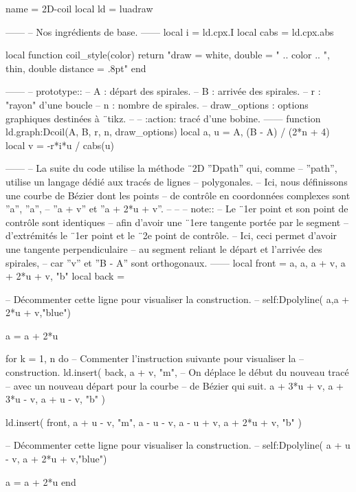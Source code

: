 \documentclass[varwidth]{standalone}
\begin{document}
\begin{luadraw*}{name = 2D-coil}
local ld = luadraw

------
-- Nos ingrédients de base.
------
local i    = ld.cpx.I
local cabs = ld.cpx.abs

local function coil_style(color)
  return "draw = white, double = " .. color
      .. ", thin, double distance = .8pt"
end

------
-- prototype::
--     A            : départ des spirales.
--     B            : arrivée des spirales.
--     r            : "rayon" d'une boucle
--     n            : nombre de spirales.
--     draw_options : options graphiques destinées à ¨tikz.
--
--     :action: tracé d'une bobine.
------
function ld.graph:Dcoil(A, B, r, n, draw_options)
  local a, u = A, (B - A) / (2*n + 4)
  local v    = -r*i*u / cabs(u)

------
-- La suite du code utilise la méthode ¨2D ''Dpath'' qui, comme
-- ''path'', utilise un langage dédié aux tracés de lignes
-- polygonales.
-- Ici, nous définissons une courbe de Bézier dont les points
-- de contrôle en coordonnées complexes sont ''a'', ''a'',
-- ''a + v'' et ''a + 2*u + v''.
--
--
-- note::
--     Le ¨1er point et son point de contrôle sont identiques
--     afin d'avoir une ¨1ere tangente portée par le segment
--     d'extrémités le ¨1er point et le ¨2e point de contrôle.
--     Ici, ceci permet d'avoir une tangente perpendiculaire
--     au segment reliant le départ et l'arrivée des spirales,
--     car ''v'' et ''B - A'' sont orthogonaux.
------
  local front = {a, a, a + v, a + 2*u + v, "b"}
  local back  = {}

-- Décommenter cette ligne pour visualiser la construction.
--  self:Dpolyline( {a,a + 2*u + v},"blue")

  a = a + 2*u

  for k = 1, n do
-- Commenter l'instruction suivante pour visualiser la
-- construction.
    ld.insert(
      back,
      {
        a + v, "m", -- On déplace le début du nouveau tracé
                    -- avec un nouveau départ pour la courbe
                    -- de Bézier qui suit.
        a + 3*u + v, a + 3*u - v, a + u - v, "b"
      }
    )

    ld.insert(
      front,
      {
        a + u - v, "m",
        a - u - v, a - u + v, a + 2*u + v, "b"
      }
    )

-- Décommenter cette ligne pour visualiser la construction.
--    self:Dpolyline( {a + u - v, a + 2*u + v},"blue")

    a = a + 2*u
  end


\end{luadraw*}
\end{document}
